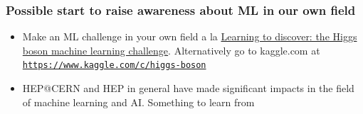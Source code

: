 \documentclass{beamer}
\begin{document}
\begin{frame}
\frametitle{Possible start to raise awareness about ML in our own field}

\begin{block}{}
\begin{itemize}
\item Make an ML challenge in your own field a la \href{{https://home.cern/news/news/computing/higgs-boson-machine-learning-challenge}}{Learning to discover: the Higgs boson machine learning challenge}. Alternatively go to kaggle.com at \href{{https://www.kaggle.com/c/higgs-boson}}{\nolinkurl{https://www.kaggle.com/c/higgs-boson}}

\item HEP@CERN and HEP in general have made significant impacts in the field of machine learning and AI. Something to learn from
\end{itemize}

\noindent
\end{block}
\end{frame}
\end{document}
